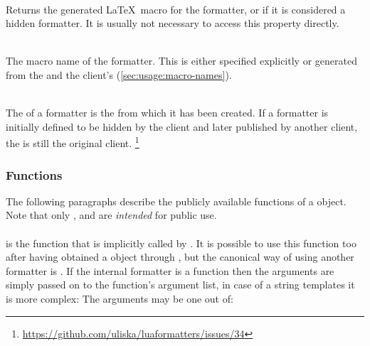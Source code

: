\documentclass[12pt]{scrartcl}
\begin{document}
\begin{itemize*}
\item {}\\
Returns the generated \LaTeX\ macro for the formatter, or  if it is
considered a hidden formatter.  It is usually not necessary to access this
property directly.

\item {}\\
The macro name of the formatter.  This is either specified explicitly or
generated from the  and the client's 
(\vref{sec:usage:macro-names}).

\item {}\\
The  of a formatter is the  from which it has been
created.  If a formatter is initially defined to be hidden by the client and
later published by another client, the  is still the original
client.%
\footnote{ \url{https://github.com/uliska/luaformatters/issues/34}}

\end{itemize*}


\subsubsection{ Functions}
\label{sec:advanced:formatter-functions}

The following paragraphs describe the publicly available functions of a
 object.  Note that only ,
 and  are \emph{intended} for public
use.


\paragraph{}
\label{sec:advanced:formatter:apply}

is the function that is implicitly called by .  It is
possible to use this function too after having obtained a 
object through , but the canonical way of using
another formatter is .  If the internal formatter
is a function then the  arguments are simply passed on to the
function's argument list, in case of a string templates it is more complex: The
arguments may be one out of:
\end{document}
